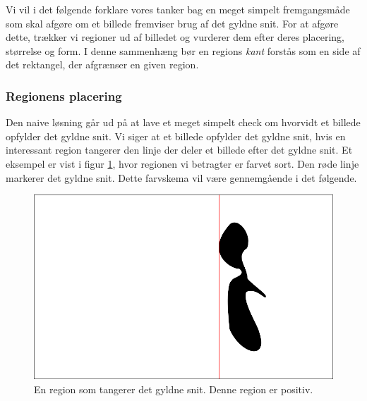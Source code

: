 {
\def\imgscale{0.34}

\textsf{Vi vil i det følgende forklare vores tanker bag en meget simpelt
fremgangsmåde som skal afgøre om et billede fremviser brug af det gyldne
snit. For at afgøre dette, trækker vi regioner ud af
billedet og vurderer dem efter deres placering, størrelse og form. I
denne sammenhæng bør en regions \emph{kant} forstås som en side af det
rektangel, der afgrænser en given region.}

\subsubsection{Regionens placering}
Den naive løsning går ud på at lave et meget simpelt check om hvorvidt
et billede opfylder det gyldne snit. Vi siger at et billede
opfylder det gyldne snit, hvis en interessant region tangerer den linje
der deler et billede efter det gyldne snit. Et eksempel er vist i figur
\ref{pos_naiv_1}, hvor regionen vi betragter er farvet sort. Den røde
linje markerer det gyldne snit. Dette farvskema vil være gennemgående i
det følgende.
\begin{figure}[h]
	\begin{center}
		\includegraphics[scale=\imgscale,angle=0]{afsnit/vores_implementation/billeder/naiv_algoritme/naiv_positiv_blob_1}
	\end{center}
	\caption[En positiv region]{En region som tangerer det gyldne snit.
	Denne region er positiv.}
	\label{pos_naiv_1}
\end{figure}

}
